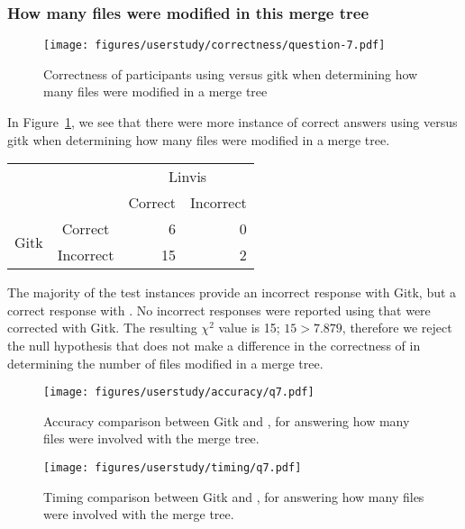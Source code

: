 \subsubsection{How many files were modified in this merge tree}
\label{ssub:how_many_files_were_modified_in_this_merge_tree}

\begin{figure}[htpb]
  \centering
  \texttt{[image: figures/userstudy/correctness/question-7.pdf]}
  \caption{Correctness of participants using \tool versus gitk when
    determining how many files were modified in a merge tree}
  \label{fig:q_7_correctness}
\end{figure}

In Figure~\ref{fig:q_7_correctness}, we see that there were more
instance of correct answers using \tool versus gitk when determining how
many files were modified in a merge tree.

\begin{center}
  \begin{tabular}{cc|rr}
                           &           & \multicolumn{2}{c}{Linvis}\\
                           &           & Correct                      & Incorrect\\\hline
    \multirow{2}{*}{Gitk}  & Correct   & 6                            & 0\\
                           & Incorrect & 15                           & 2\\
  \end{tabular}
\end{center}

The majority of the test instances provide an incorrect response with
Gitk, but a correct response with \tool. No incorrect responses were
reported using \tool that were corrected with Gitk. The resulting
$\chi^2$ value is 15; $15 > 7.879$, therefore we reject the null
hypothesis that \tool does not make a difference in the correctness of
in determining the number of files modified in a merge tree.

\begin{figure}[htpb]
  \centering
  \texttt{[image: figures/userstudy/accuracy/q7.pdf]}
  \caption{Accuracy comparison between Gitk and \tool, for answering how
  many files were involved with the merge tree.}
  \label{fig:q7_accuracy}
\end{figure}

\begin{figure}[htpb]
  \centering
  \texttt{[image: figures/userstudy/timing/q7.pdf]}
  \caption{Timing comparison between Gitk and \tool, for answering how
    many files were involved with the merge tree.}
  \label{fig:q7_timing}
\end{figure}

